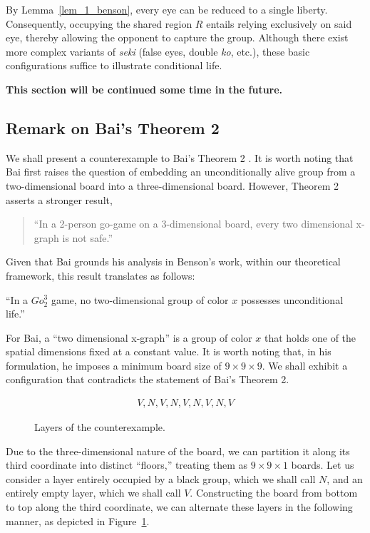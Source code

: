 By Lemma~\ref{lem_1_benson}, every eye can be reduced to a single liberty. Consequently, occupying the shared region \(R\) entails relying exclusively on said eye, thereby allowing the opponent to capture the group. Although there exist more complex variants of \textit{seki} (false eyes, double \textit{ko}, etc.), these basic configurations suffice to illustrate conditional life.

\textbf{This section will be continued some time in the future.}

\vspace{1cm}
\subsection{Remark on Bai's Theorem 2}
We shall present a counterexample to Bai's Theorem 2 \cite{KJB1, KJB2}. It is worth noting that Bai first raises the question of embedding an unconditionally alive group from a two-dimensional board into a three-dimensional board. However, Theorem 2 asserts a stronger result,

\begin{quote}
	``In a 2-person go-game on a 3-dimensional board, every two dimensional x-graph is not safe.''
\end{quote}

Given that Bai grounds his analysis in Benson's work, within our theoretical framework, this result translates as follows:

``In a \(Go_{2}^{3}\) game, no two-dimensional group of color \(x\) possesses unconditional life.''

For Bai, a ``two dimensional x-graph'' is a group of color \(x\) that holds one of the spatial dimensions fixed at a constant value. It is worth noting that, in his formulation, he imposes a minimum board size of \(9 \times 9 \times 9\). We shall exhibit a configuration that contradicts the statement of Bai's Theorem 2.

\begin{figure}
	\vspace{-15pt}
	\begin{align*}
		V,N,V,N,V,N,V,N,V
	\end{align*}
	\caption{Layers of the counterexample.}
	\label{contraej_bai}
\end{figure}Due to the three-dimensional nature of the board, we can partition it along its third coordinate into distinct ``floors,'' treating them as \(9\times 9 \times 1\) boards. Let us consider a layer entirely occupied by a black group, which we shall call \(N\), and an entirely empty layer, which we shall call \(V\). Constructing the board from bottom to top along the third coordinate, we can alternate these layers in the following manner, as depicted in Figure~\ref{contraej_bai}. 

